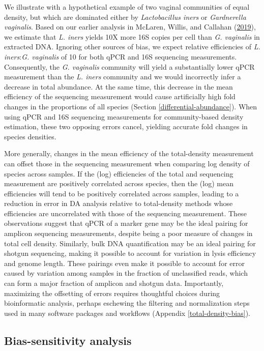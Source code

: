 \documentclass[
]{article}
\begin{document}
We illustrate with a hypothetical example of two vaginal communities of equal density, but which are dominated either by \emph{Lactobacillus iners} or \emph{Gardnerella vaginalis}.
Based on our earlier analysis in McLaren, Willis, and Callahan (\protect\hyperlink{ref-mclaren2019cons}{2019}), we estimate that \emph{L. iners} yields 10X more 16S copies per cell than \emph{G. vaginalis} in extracted DNA.
Ignoring other sources of bias, we expect relative efficiencies of \emph{L. iners}:\emph{G. vaginalis} of 10 for both qPCR and 16S sequencing measurements.
Consequently, the \emph{G. vaginalis} community will yield a substantially lower qPCR measurement than the \emph{L. iners} community and we would incorrectly infer a decrease in total abundance.
At the same time, this decrease in the mean efficiency of the sequencing measurement would cause artificially high fold changes in the proportions of all species (Section \ref{differential-abundance}).
When using qPCR and 16S sequencing measurements for community-based density estimation, these two opposing errors cancel, yielding accurate fold changes in species densities.

More generally, changes in the mean efficiency of the total-density measurement can offset those in the sequencing measurement when comparing log density of species across samples.
If the (log) efficiencies of the total and sequencing measurement are positively correlated across species, then the (log) mean efficiencies will tend to be positively correlated across samples, leading to a reduction in error in DA analysis relative to total-density methods whose efficiencies are uncorrelated with those of the sequencing measurement.
These observations suggest that qPCR of a marker gene may be the ideal pairing for amplicon sequencing measurements, despite being a poor measure of changes in total cell density.
Similarly, bulk DNA quantification may be an ideal pairing for shotgun sequencing, making it possible to account for variation in lysis efficiency and genome length.
These pairings even make it possible to account for error caused by variation among samples in the fraction of unclassified reads, which can form a major fraction of amplicon and shotgun data.
Importantly, maximizing the offsetting of errors requires thoughtful choices during bioinformatic analysis, perhaps eschewing the filtering and normalization steps used in many software packages and workflows (Appendix \ref{total-density-bias}).

\hypertarget{bias-sensitivity-analysis}{%
\subsection{Bias-sensitivity analysis}\label{bias-sensitivity-analysis}}
\end{document}

